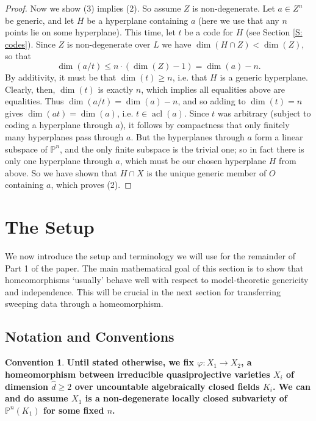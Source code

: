 \documentclass{amsart}
\theoremstyle{definition}
\newtheorem{convention}[theorem]{Convention}
\newcommand{\acl}{\operatorname{acl}}
\begin{document}
\begin{proof}
    Now we show (3) implies (2). So assume $Z$ is non-degenerate. Let $a\in Z^n$ be generic, and let $H$ be a hyperplane containing $a$ (here we use that any $n$ points lie on some hyperplane). This time, let $t$ be a code for $H$ (see Section \ref{S: codes}). Since $Z$ is non-degenerate over $L$ we have $\dim(H\cap Z)<\dim(Z)$, so that $$\dim(a/t)\leq n\cdot(\dim(Z)-1)=\dim(a)-n.$$ By additivity, it must be that $\dim(t)\geq n$, i.e. that $H$ is a generic hyperplane. Clearly, then, $\dim(t)$ is exactly $n$, which implies all equalities above are equalities. Thus $\dim(a/t)=\dim(a)-n$, and so adding to $\dim(t)=n$ gives $\dim(at)=\dim(a)$, i.e. $t\in\acl(a)$. Since $t$ was arbitrary (subject to coding a hyperplane through $a$), it follows by compactness that only finitely many hyperplanes pass through $a$. But the hyperplanes through $a$ form a linear subspace of $\mathbb P^n$, and the only finite subspace is the trivial one; so in fact there is only one hyperplane through $a$, which must be our chosen hyperplane $H$ from above. So we have shown that $H\cap X$ is the unique generic member of $O$ containing $a$, which proves (2). 
\end{proof}

\section{The Setup}

We now introduce the setup and terminology we will use for the remainder of Part 1 of the paper. The main mathematical goal of this section is to show that homeomorphisms `usually' behave well with respect to model-theoretic genericity and independence. This will be crucial in the next section for transferring sweeping data through a homeomorphism.

\subsection{Notation and Conventions}

\begin{convention}\label{Convention homeomorphism} \textbf{Until stated otherwise, we fix $\varphi:X_1\rightarrow X_2$, a homeomorphism between irreducible quasiprojective varieties $X_i$ of dimension $\hat d\geq 2$ over uncountable algebraically closed fields $K_i$. We can and do assume $X_1$ is a non-degenerate locally closed subvariety of $\mathbb P^n(K_1)$ for some fixed $n$.} 
\end{convention}
\end{document}
